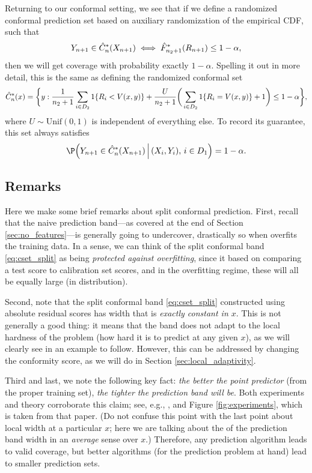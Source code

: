 \documentclass{article}
\begin{document}
Returning to our conformal setting, we see that if we define a randomized
conformal prediction set based on auxiliary randomization of the empirical CDF, 
such that  
\[
Y_{n+1} \in \hat{C}_n^*(X_{n+1}) \iff \hat{F}_{n_2+1}^*(R_{n+1}) \leq 1-\alpha,
\] 
then we will get coverage with probability exactly $1-\alpha$. Spelling it out
in more detail, this is the same as defining the randomized conformal set 
\begin{equation}
\label{eq:cset_rand_split}
\hat{C}_n^*(x) = \bigg\{ y : \frac{1}{n_2+1} \sum_{i \in D_2} 1\{ R_i < V(x,y) \} 
+ \frac{U}{n_2+1} \bigg( \sum_{i \in D_2} 1\{ R_i = V(x,y) \} + 1 \bigg)
\leq 1-\alpha \bigg\},
\end{equation}
where $U \sim \mathrm{Unif}(0,1)$ is independent of everything else. To record
its guarantee, this set always satisfies  
\begin{equation}
\label{eq:coverage_rand_split}
\P\Big( Y_{n+1} \in \hC_n^*(X_{n+1}) \, \Big| \, (X_i,Y_i), \, i \in D_1 \Big) = 
1-\alpha. 
\end{equation}

\subsection{Remarks}

Here we make some brief remarks about split conformal prediction. First, recall
that the naive prediction band---as covered at the end of Section
\ref{sec:no_features}---is generally going to undercover, drastically so when
 overfits the training data. In a sense, we can think of the 
split conformal band \eqref{eq:cset_split} as being \emph{protected against
  overfitting}, since it based on comparing a test score to calibration set
scores, and in the overfitting regime, these will all be equally large (in
distribution).   

Second, note that the split conformal band \eqref{eq:cset_split} constructed
using absolute residual scores has width that is \emph{exactly constant in
  $x$}. This is not generally a good thing: it means that the band does not
adapt to the local hardness of the problem (how hard it is to predict at any
given $x$), as we will clearly see in an example to follow. However, this can be
addressed by changing the conformity score, as we will do in Section
\ref{sec:local_adaptivity}.    

Third and last, we note the following key fact: \emph{the better the point
  predictor } (from the proper training set), \emph{the
  tighter the prediction band will be}. Both experiments and theory corroborate
this claim; see, e.g., \citet{lei2018distribution}, and Figure
\ref{fig:experiments}, which is taken from that paper. (Do not confuse this
point with the last point about local width at a particular $x$; here we are
talking about the of the prediction band width in an \emph{average} sense over
$x$.) Therefore, any prediction algorithm leads to valid coverage, but better
algorithms (for the prediction problem at hand) lead to smaller prediction
sets. 
\end{document}
